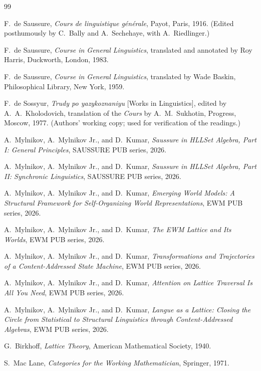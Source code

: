 \documentclass[11pt,a4paper]{article}
\theoremstyle{remark}
\begin{document}
\begin{thebibliography}{99}

 F.~de Saussure,
\textit{Cours de linguistique g\'en\'erale}, Payot, Paris, 1916.
(Edited posthumously by C.~Bally and A.~Sechehaye, with A.~Riedlinger.)

 F.~de Saussure,
\textit{Course in General Linguistics}, translated and annotated by
Roy Harris, Duckworth, London, 1983.

 F.~de Saussure,
\textit{Course in General Linguistics}, translated by Wade Baskin,
Philosophical Library, New York, 1959.

 F.~de Sossyur,
\textit{Trudy po yazykoznaniyu} [Works in Linguistics], edited by
A.~A.~Kholodovich, translation of the \textit{Cours} by A.~M.~Sukhotin,
Progress, Moscow, 1977.
(Authors' working copy; used for verification of the readings.)

 A.~Mylnikov, A.~Mylnikov Jr., and D.~Kumar,
\textit{Saussure in HLLSet Algebra, Part I: General Principles},
SAUSSURE PUB series, 2026.

 A.~Mylnikov, A.~Mylnikov Jr., and D.~Kumar,
\textit{Saussure in HLLSet Algebra, Part II: Synchronic Linguistics},
SAUSSURE PUB series, 2026.

 A.~Mylnikov, A.~Mylnikov Jr., and D.~Kumar,
\textit{Emerging World Models: A Structural Framework for Self-Organizing
World Representations}, EWM PUB series, 2026.

 A.~Mylnikov, A.~Mylnikov Jr., and D.~Kumar,
\textit{The EWM Lattice and Its Worlds}, EWM PUB series, 2026.

 A.~Mylnikov, A.~Mylnikov Jr., and D.~Kumar,
\textit{Transformations and Trajectories of a Content-Addressed State
Machine}, EWM PUB series, 2026.

 A.~Mylnikov, A.~Mylnikov Jr., and D.~Kumar,
\textit{Attention on Lattice Traversal Is All You Need}, EWM PUB series, 2026.

 A.~Mylnikov, A.~Mylnikov Jr., and D.~Kumar,
\textit{Langue as a Lattice: Closing the Circle from Statistical to
Structural Linguistics through Content-Addressed Algebras}, EWM PUB series,
2026.

 G.~Birkhoff,
\textit{Lattice Theory}, American Mathematical Society, 1940.

 S.~Mac Lane,
\textit{Categories for the Working Mathematician}, Springer, 1971.


\end{thebibliography}
\end{document}
